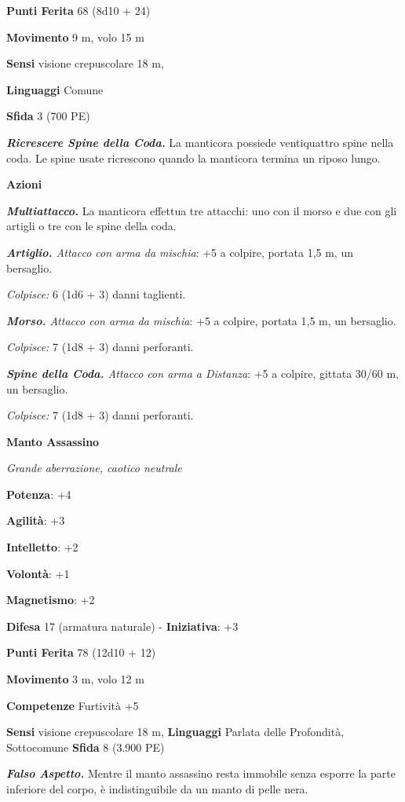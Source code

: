 \begin{multicols}{2}
\textbf{Punti Ferita} 68 (8d10 + 24)

\textbf{Movimento} 9 m, volo 15 m

\textbf{Sensi} visione crepuscolare 18 m, 

\textbf{Linguaggi} Comune

\textbf{Sfida} 3 (700 PE)

\emph{\textbf{Ricrescere Spine della Coda.}} La manticora possiede
ventiquattro spine nella coda. Le spine usate ricrescono quando la
manticora termina un riposo lungo.

\textbf{Azioni}

\emph{\textbf{Multiattacco.}} La manticora effettua tre attacchi: uno
con il morso e due con gli artigli o tre con le spine della coda.

\emph{\textbf{Artiglio.} Attacco con arma da mischia}: +5 a colpire,
portata 1,5 m, un bersaglio.

\emph{Colpisce:} 6 (1d6 + 3) danni taglienti.

\emph{\textbf{Morso.} Attacco con arma da mischia}: +5 a colpire,
portata 1,5 m, un bersaglio.

\emph{Colpisce:} 7 (1d8 + 3) danni perforanti.

\emph{\textbf{Spine della Coda.} Attacco con arma a Distanza}: +5 a
colpire, gittata 30/60 m, un bersaglio.

\emph{Colpisce:} 7 (1d8 + 3) danni perforanti.


\textbf{Manto Assassino}

\emph{Grande aberrazione, caotico neutrale}

\textbf{Potenza}: +4

\textbf{Agilità}: +3

\textbf{Intelletto}: +2

\textbf{Volontà}: +1

\textbf{Magnetismo}: +2

\textbf{Difesa} 17 (armatura naturale) - \textbf{Iniziativa}: +3

\textbf{Punti Ferita} 78 (12d10 + 12)

\textbf{Movimento} 3 m, volo 12 m

\textbf{Competenze} Furtività +5

\textbf{Sensi} visione crepuscolare 18 m, 
\textbf{Linguaggi} Parlata delle Profondità, Sottocomune \textbf{Sfida}
8 (3.900 PE)

\emph{\textbf{Falso Aspetto.}} Mentre il manto assassino resta immobile
senza esporre la parte inferiore del corpo, è indistinguibile da un
manto di pelle nera.


\end{multicols}
